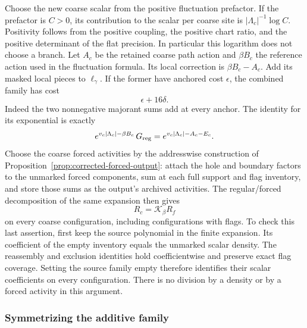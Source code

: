 Choose the new coarse scalar from the positive fluctuation prefactor.
If the prefactor is $C>0$, its contribution to the scalar per coarse
site is $|\Lambda_c|^{-1}\log C$. Positivity follows from the positive
coupling, the positive chart ratio, and the positive determinant of the
flat precision. In particular this logarithm does not choose a branch.
Let $A_c$ be the retained coarse path action and $\beta B_c$ the
reference action used in the fluctuation formula. Its local correction
is $\beta B_c-A_c$. Add its masked local pieces to
$\ell_\gamma$. If the former have anchored cost $\epsilon$, the
combined family has cost
\begin{equation}\label{eq:restart-newcost}
                         \epsilon+16\delta.
\end{equation}
Indeed the two nonnegative majorant sums add at every anchor. The
identity for its exponential is exactly
\[
 e^{v_c|\Lambda_c|-\beta B_c}\,G_{\rm reg}
       =e^{v_c|\Lambda_c|-A_c-E_c}.
\]
Choose the coarse forced activities by the addresswise construction of
Proposition~\ref{prop:corrected-forced-output}: attach the hole and
boundary factors to the unmarked forced components, sum at each full
support and flag inventory, and store those sums as the output's
archived activities. The regular/forced decomposition of the same expansion then gives
\begin{equation}\label{eq:restart-push}
                  R_c=\mathcal K_\beta R_f
\end{equation}
on every coarse configuration, including configurations with flags.
To check this last assertion, first keep the source polynomial in the
finite expansion. Its coefficient of the empty inventory equals the
unmarked scalar density. The reassembly and exclusion identities hold
coefficientwise and preserve exact flag coverage. Setting the source
family empty therefore identifies their scalar coefficients on every
configuration. There is no division by a density or by a forced
activity in this argument.

\subsubsection{Symmetrizing the additive family}

